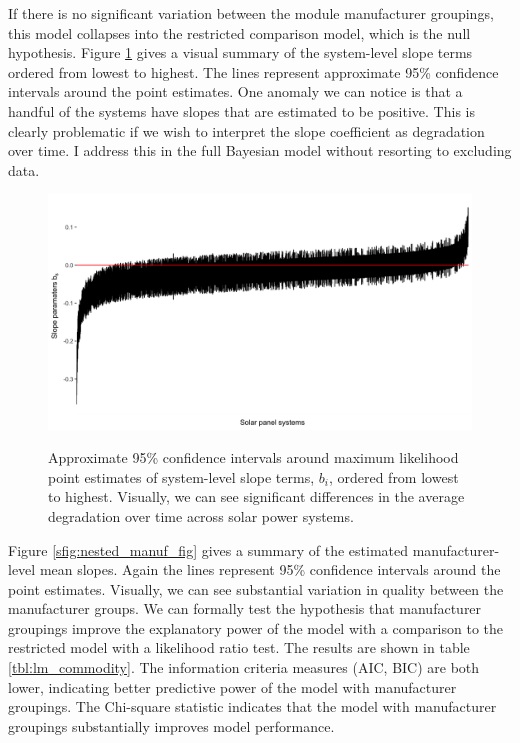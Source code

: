 \documentclass[a4paper]{article}
\begin{document}
If there is no significant variation between the module manufacturer groupings, this model collapses into the restricted comparison model, which is the null hypothesis. Figure \ref{sfig:sys_slope_fig} gives a visual summary of the system-level slope terms ordered from lowest to highest. The lines represent approximate 95\% confidence intervals around the point estimates. One anomaly we can notice is that a handful of the systems have slopes that are estimated to be positive. This is clearly problematic if we wish to interpret the slope coefficient as degradation over time. I address this in the full Bayesian model without resorting to excluding data.

\begin{figure}
  \caption{Approximate 95\% confidence intervals around maximum likelihood point estimates of system-level slope terms, $b_i$, ordered from lowest to highest. Visually, we can see significant differences in the average degradation over time across solar power systems.}
  \includegraphics[width=1\linewidth]{figures/sys_slope_fig.png}
  \label{sfig:sys_slope_fig}
\end{figure}

Figure \ref{sfig:nested_manuf_fig} gives a summary of the estimated manufacturer-level mean slopes. Again the lines represent 95\% confidence intervals around the point estimates. Visually, we can see substantial variation in quality between the manufacturer groups. We can formally test the hypothesis that manufacturer groupings improve the explanatory power of the model with a comparison to the restricted model with a likelihood ratio test. The results are shown in table \ref{tbl:lm_commodity}. The information criteria measures (AIC, BIC) are both lower, indicating better predictive power of the model with manufacturer groupings. The Chi-square statistic indicates that the model with manufacturer groupings substantially improves model performance.
\end{document}
